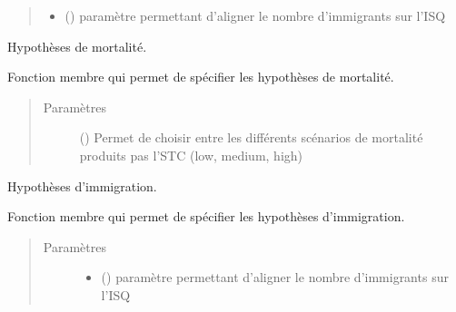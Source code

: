 \documentclass[letterpaper,10pt,french]{sphinxmanual}
\begin{document}
\begin{fulllineitems}
\begin{fulllineitems}
\begin{quote}
\begin{description}
\begin{itemize}
\item {} 
 () \textendash{} paramètre permettant d’aligner le nombre d’immigrants sur l’ISQ

\end{itemize}

\end{description}\end{quote}

\end{fulllineitems}


\begin{fulllineitems}
\label{\detokenize{utilisation:simgen.model.dead_assumptions}}
Hypothèses de mortalité.

Fonction membre qui permet de spécifier les hypothèses de mortalité.
\begin{quote}\begin{description}
\item[{Paramètres}] \leavevmode
{} () \textendash{} Permet de choisir entre les différents scénarios de mortalité produits pas l’STC (low, medium, high)

\end{description}\end{quote}

\end{fulllineitems}


\begin{fulllineitems}
\label{\detokenize{utilisation:simgen.model.immig_assumptions}}
Hypothèses d’immigration.

Fonction membre qui permet de spécifier les hypothèses d’immigration.
\begin{quote}\begin{description}
\item[{Paramètres}] \leavevmode\begin{itemize}
\item {} 
 () \textendash{} paramètre permettant d’aligner le nombre d’immigrants sur l’ISQ


\end{itemize}
\end{description}
\end{quote}
\end{fulllineitems}
\end{fulllineitems}
\end{document}
